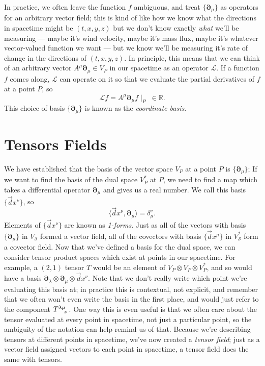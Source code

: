 In practice, we often leave the function $f$ ambiguous, and treat $\{\bm{\partial}_\mu\}$ as operators for an arbitrary vector field; this is kind of like how we know what the directions in spacetime might be $(t,x,y,z)$ but we don't know exactly \emph{what} we'll be measuring --- maybe it's wind velocity, maybe it's mass flux, maybe it's whatever vector-valued function we want --- but we know we'll be measuring it's rate of change in the directions of $(t,x,y,z)$.
In principle, this means that we can think of an arbitrary vector $A^\mu \bm{\partial}_\mu \in V_P$ in our spacetime as an operator $\mathcal{L}$.
If a function $f$ comes along, $\mathcal{L}$ can operate on it so that we evaluate the partial derivatives of $f$ at a point $P$, so
\[ \mathcal{L}f = A^\mu \bm{\partial}_\mu f \mid_P \;\in \mathbb{R}. \]
This choice of basis $\{\bm{\partial}_\mu\}$ is known as the \emph{coordinate basis}.

\section{Tensors Fields}
We have established that the basis of the vector space $V_P$ at a point $P$ is $\{\bm{\partial}_\mu\}$;
If we want to find the basis of the dual space $V^*_P$ at $P$, we need to find a map which takes a differential operator $\bm{\partial}_\mu$ and gives us a real number.
We call this basis $\{\vec{d}x^\nu\}$, so
\[ \langle \vec{d}x^\nu, \bm{\partial}_\mu \rangle = \delta^\nu_\mu. \]
Elements of $\{\vec{d}x^\nu\}$ are known as \emph{1-forms}. Just as all of the vectors with basis $\{\bm{\partial}_\mu\}$ in $V_\mathcal{S}$ formed a vector field, all of the covectors with basis $\{\vec{d}x^\mu\}$ in $V^*_\mathcal{S}$ form a covector field.
Now that we've defined a basis for the dual space, we can consider tensor product spaces which exist at points in our spacetime.
For example, a $(2,1)$ tensor $T$ would be an element of $V_P \otimes V_P \otimes V^*_P$, and so would have a basis $\bm{\partial}_\lambda \otimes \bm{\partial}_\mu \otimes \vec{d}x^\nu$.
Note that we don't really write which point we're evaluating this basis at; in practice this is contextual, not explicit, and remember that we often won't even write the basis in the first place, and  would just refer to the component $\tensor{T}{^{\lambda\mu}_\nu}$.
One way this is even useful is that we often care about the tensor evaluated at every point in spacetime, not just a particular point, so the ambiguity of the notation can help remind us of that.
Because we're describing tensors at different points in spacetime, we've now created a \emph{tensor field}; just as a vector field assigned vectors to each point in spacetime, a tensor field does the same with tensors.

